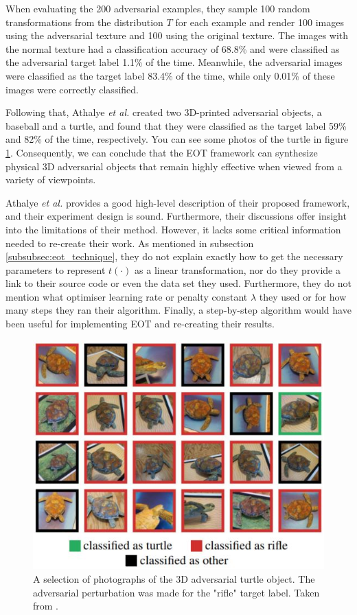 When evaluating the 200 adversarial examples, they sample 100 random transformations from the distribution $T$ for each example and render 100 images using the adversarial texture and 100 using the original texture. The images with the normal texture had a classification accuracy of 68.8\% and were classified as the adversarial target label 1.1\% of the time. Meanwhile, the adversarial images were classified as the target label 83.4\% of the time, while only 0.01\% of these images were correctly classified.

Following that, Athalye \textit{et al.} created two 3D-printed adversarial objects, a baseball and a turtle, and found that they were classified as the target label 59\% and 82\% of the time, respectively. You can see some photos of the turtle in figure \ref{fig:3d_turtle}. Consequently, we can conclude that the EOT framework can synthesize physical 3D adversarial objects that remain highly effective when viewed from a variety of viewpoints.

Athalye \textit{et al.} \cite{athalye} provides a good high-level description of their proposed framework, and their experiment design is sound. Furthermore, their discussions offer insight into the limitations of their method. However, it lacks some critical information needed to re-create their work. As mentioned in subsection \ref{subsubsec:eot_technique}, they do not explain exactly how to get the necessary parameters to represent $t(\cdot)$ as a linear transformation, nor do they provide a link to their source code or even the data set they used. Furthermore, they do not mention what optimiser learning rate or penalty constant $\lambda$ they used or for how many steps they ran their algorithm. Finally, a step-by-step algorithm would have been useful for implementing EOT and re-creating their results.

\begin{figure}[ht]
    \centering
    \includegraphics[width=1\textwidth]{graphics/turtle.JPG}
    \caption{A selection of photographs of the 3D adversarial turtle object. The adversarial perturbation was made for the "rifle" target label. Taken from \cite{athalye}.}
    \label{fig:3d_turtle}
\end{figure}

